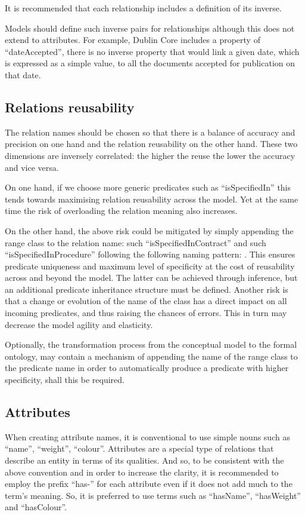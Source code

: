 	It is recommended that each relationship includes a definition of its inverse. 
	
	Models should define such inverse pairs for relationships although this does not extend to attributes. For example, Dublin Core\citep{dublin-core-metadata} includes a property of ``dateAccepted'', there is no inverse property that would link a given date, which is expressed as a simple value, to all the documents accepted for publication on that date.
	
	\subsection{Relations reusability}	
	\label{sec:relation-reusability}
	
	The relation names should be chosen so that there is a balance of accuracy and precision on one hand and the relation reusability on the other hand. These two dimensions are inversely correlated: the higher the reuse the lower the accuracy and vice versa. 
	
	On one hand, if we choose more generic predicates such as ``isSpecifiedIn'' this tends towards maximising relation reusability across the model. Yet at the same time the risk of overloading the relation meaning also increases. 
	
	On the other hand, the above risk could be mitigated by simply appending the range class to the relation name: such ``isSpecifiedInContract'' and such ``isSpecifiedInProcedure'' following the following naming pattern:    . This ensures predicate uniqueness and maximum level of specificity at the cost of reusability across and beyond the model. The latter can be achieved through inference, but an additional predicate inheritance structure must be defined.  Another risk is that a change or evolution of the name of the class has a direct impact on all incoming predicates, and thus raising the chances of errors. This in turn may decrease the model agility and elasticity.
	
	Optionally, the transformation process from the conceptual model to the formal ontology, may contain a mechanism of appending the name of the range class to the predicate name in order to automatically produce a predicate with higher specificity, shall this be required. 
	
	\subsection{Attributes}
	\label{sec:attributes}
	When creating attribute names, it is conventional to use simple nouns such as ``name'', ``weight'', ``colour''. Attributes are a special type of relations that describe an entity in terms of its qualities. And so, to be consistent with the above convention and in order to increase the clarity, it is recommended to employ the prefix ``has-'' for each attribute even if it does not add much to the term’s meaning. So, it is preferred to use terms such as ``hasName'', ``hasWeight'' and ``hasColour''.
	
